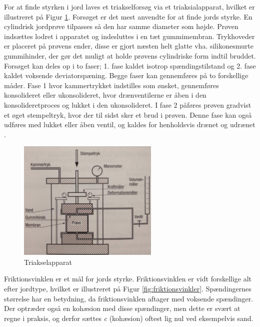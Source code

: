 For at finde styrken i jord laves et triakselforsøg via et triaksialapparat, hvilket er illustreret på Figur \ref{fig:forskudningsspanding}. Forsøget er det mest anvendte for at finde jords styrke. En cylindrisk jordprøve tilpasses så den har samme diameter som højde. Prøven indsættes lodret i apparatet og indesluttes i en tæt gummimembran. Trykhoveder er placeret på prøvens ender, disse er gjort næsten helt glatte vha. silikonesmurte gummihinder, der gør det muligt at holde prøvens cylindriske form indtil bruddet.  
\newline \indent{     } Forsøget kan deles op i to faser; 1. fase kaldet isotrop spændingstilstand og 2. fase kaldet voksende deviatorspæning. Begge faser kan gennemføres på to forskellige måder. Fase 1 hvor kammertrykket indstilles som ønsket, gennemføres konsolideret eller ukonsolideret, hvor drænventilerne er åben i den konsolideretproces og lukket i den ukonsolideret. I fase 2 påføres prøven gradvist et øget stempeltryk, hvor der til sidst sker et brud i prøven. Denne fase kan også udføres med lukket eller åben ventil, og kaldes for henholdsvis drænet og udrænet \citep{geoteknik}.

\begin{figure}[htbp]
	\centering
	\includegraphics[width=0.6\textwidth]{billeder/forskud.png}
	\caption{Triakselapparat \citep{geoteknik}}
	\label{fig:forskudningsspanding}
\end{figure}

Friktionsvinklen er et mål for jords styrke. Friktionsvinklen er vidt forskellige alt efter jordtype, hvilket er illustreret på Figur \ref{fig:friktionsvinkler}. Spændingernes størrelse har en betydning, da friktionsvinklen aftager med voksende spændinger. Der optræder også en kohæsion med disse spændinger, men dette er svært at regne i praksis, og derfor sættes \textit{c} (kohæsion) oftest lig nul ved eksempelvis sand. 

